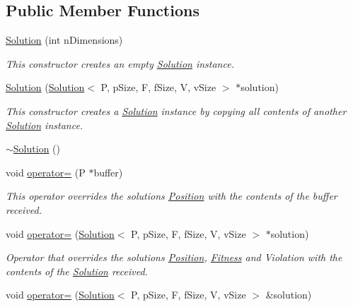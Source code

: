 \subsection*{Public Member Functions}
\begin{DoxyCompactItemize}
\item 
\hyperlink{classSolution_aed3a2146c95b8f8f06cecf9980e77c20}{Solution} (int n\+Dimensions)
\begin{DoxyCompactList}\small\item\em This constructor creates an empty \hyperlink{classSolution}{Solution} instance. \end{DoxyCompactList}\item 
\hyperlink{classSolution_a763a8e70b722bb0679046d8c8b8223e5}{Solution} (\hyperlink{classSolution}{Solution}$<$ P, p\+Size, F, f\+Size, V, v\+Size $>$ $\ast$solution)
\begin{DoxyCompactList}\small\item\em This constructor creates a \hyperlink{classSolution}{Solution} instance by copying all contents of another \hyperlink{classSolution}{Solution} instance. \end{DoxyCompactList}\item 
\hyperlink{classSolution_afd40b1d7d953e0dde4a02d22f19079ad}{$\sim$\+Solution} ()
\item 
void \hyperlink{classSolution_a8943fc57439d7e23ffb4cc4c49ae106e}{operator=} (P $\ast$buffer)
\begin{DoxyCompactList}\small\item\em This operator overrides the solution\textquotesingle{}s \hyperlink{structPosition}{Position} with the contents of the buffer received. \end{DoxyCompactList}\item 
void \hyperlink{classSolution_a1eb06ad9c9e36af504d84c9d3c611f21}{operator=} (\hyperlink{classSolution}{Solution}$<$ P, p\+Size, F, f\+Size, V, v\+Size $>$ $\ast$solution)
\begin{DoxyCompactList}\small\item\em Operator that overrides the solution\textquotesingle{}s \hyperlink{structPosition}{Position}, \hyperlink{structFitness}{Fitness} and Violation with the contents of the \hyperlink{classSolution}{Solution} received. \end{DoxyCompactList}\item 
void \hyperlink{classSolution_af6f35f821332bc9414773fd659a6a29b}{operator=} (\hyperlink{classSolution}{Solution}$<$ P, p\+Size, F, f\+Size, V, v\+Size $>$ \&solution)

\end{DoxyCompactItemize}
